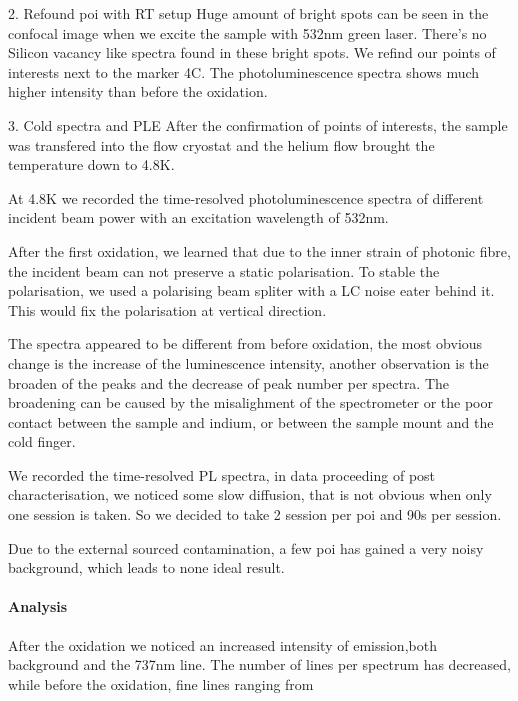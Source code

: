 2. Refound poi with RT setup
Huge amount of bright spots can be seen in the confocal image when we excite the sample with 532nm green laser. There's no Silicon vacancy like spectra found in these bright spots. We refind our points of interests next to the marker 4C. The photoluminescence spectra shows much higher intensity than before the oxidation.


3. Cold spectra and PLE 
After the confirmation of points of interests, the sample was transfered into the flow cryostat and the helium flow brought the temperature down to 4.8K.

At 4.8K we recorded the time-resolved photoluminescence spectra of different incident beam power with an excitation wavelength of 532nm. 

After the first oxidation, we learned that due to the inner strain of photonic fibre, the incident beam can not preserve a static polarisation. To stable the polarisation, we used a polarising beam spliter with a LC noise eater behind it. This would fix the polarisation at vertical direction.

The spectra appeared to be different from before oxidation, the most obvious change is the increase of the luminescence intensity, another observation is the broaden of the peaks and the decrease of peak number per spectra. The broadening can be caused by the misalighment of the spectrometer or the poor contact between the sample and indium, or between the sample mount and the cold finger. 

We recorded the time-resolved PL spectra, in data proceeding of post characterisation, we noticed some slow diffusion, that is not obvious when only one session is taken. So we decided to take 2 session per poi and 90s per session.

Due to the external sourced contamination, a few poi has gained a very noisy background, which leads to none ideal result.







\paragraph{Analysis}
After the oxidation we noticed an increased intensity of emission,both background and the 737nm line. The number of lines per spectrum has decreased, while before the oxidation, fine lines ranging from  


